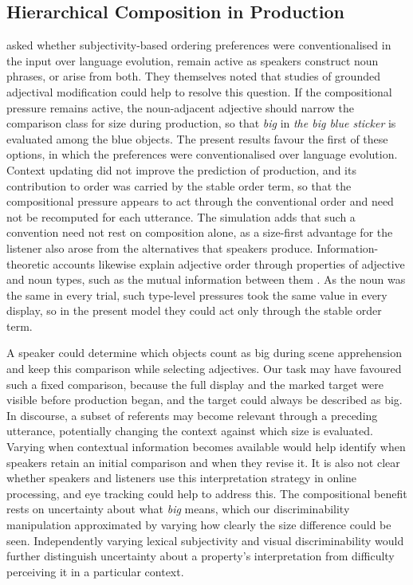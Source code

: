 \documentclass[10pt,a4paper,fleqn]{article}
\begin{document}
\subsection{Hierarchical Composition in Production}

\citet[p.~7:19]{scontras2019grammatical} asked whether subjectivity-based ordering preferences were conventionalised in the input over language evolution, remain active as speakers construct noun phrases, or arise from both.
They themselves noted that studies of grounded adjectival modification could help to resolve this question.
If the compositional pressure remains active, the noun-adjacent adjective should narrow the comparison class for size during production, so that \emph{big} in \emph{the big blue sticker} is evaluated among the blue objects.
The present results favour the first of these options, in which the preferences were conventionalised over language evolution.
Context updating did not improve the prediction of production, and its contribution to order was carried by the stable order term, so that the compositional pressure appears to act through the conventional order and need not be recomputed for each utterance.
The simulation adds that such a convention need not rest on composition alone, as a size-first advantage for the listener also arose from the alternatives that speakers produce.
Information-theoretic accounts likewise explain adjective order through properties of adjective and noun types, such as the mutual information between them \citep{Hahn_information_2018,futrell-etal-2020-determines}.
As the noun was the same in every trial, such type-level pressures took the same value in every display, so in the present model they could act only through the stable order term.

A speaker could determine which objects count as big during scene apprehension and keep this comparison while selecting adjectives.
Our task may have favoured such a fixed comparison, because the full display and the marked target were visible before production began, and the target could always be described as big.
In discourse, a subset of referents may become relevant through a preceding utterance, potentially changing the context against which size is evaluated.
Varying when contextual information becomes available would help identify when speakers retain an initial comparison and when they revise it.
It is also not clear whether speakers and listeners use this interpretation strategy in online processing, and eye tracking could help to address this.
The compositional benefit rests on uncertainty about what \emph{big} means, which our discriminability manipulation approximated by varying how clearly the size difference could be seen.
Independently varying lexical subjectivity and visual discriminability would further distinguish uncertainty about a property's interpretation from difficulty perceiving it in a particular context.
\end{document}
